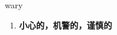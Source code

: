 
\begin{frame}
{\huge wary}
\begin{center}
\begin{enumerate}\Large
  \item \textbf{小心的，机警的，谨慎的}
\end{enumerate}
\end{center}
\end{frame}
